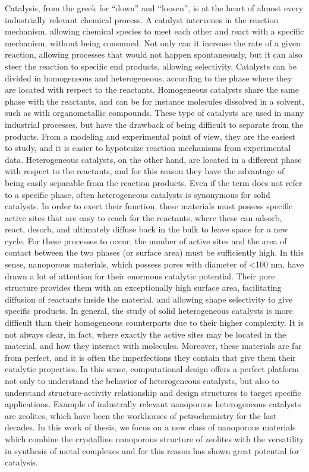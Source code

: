 Catalysis, from the greek for ``down'' and ``loosen'', is at the heart of almost every industrially relevant chemical process. A catalyst intervenes in the reaction mechanism, allowing chemical species to meet each other and react with a specific mechanism, without being consumed. Not only can it increase the rate of a given reaction, allowing processes that would not happen spontaneously, but it can also steer the reaction to specific end products, allowing selectivity. Catalysts can be divided in homogeneous and heterogeneous, according to the phase where they are located with respect to the reactants. Homogeneous catalysts share the same phase with the reactants, and can be for instance molecules dissolved in a solvent, such as with organometallic compounds. These type of catalysts are used in many industrial processes,  but have the drawback of being difficult to separate from the products. From a modeling and experimental point of view, they are the easiest to study, and it is easier to hypotesize reaction mechanisms from experimental data. Heterogeneous catalysts, on the other hand, are located in a different phase with respect to the reactants, and for this reason they have the advantage of being easily separable from the reaction products. Even if the term does not refer to a specific phase, often heterogeneous catalysts is synonymous for solid catalysts. In order to exert their function, these materials must possess specific active sites that are easy to reach for the reactants, where these can adsorb, react, desorb, and ultimately diffuse back in the bulk to leave space for a new cycle. For these processes to occur, the number of active sites and the area of contact between the two phases (or surface area) must be sufficiently high. In this sense, nanoporous materials, which possess pores with diameter of <100 nm, have drawn a lot of attention for their enormous catalytic potential. Their pore structure provides them with an exceptionally high surface area, facilitating diffusion of reactants inside the material, and allowing shape selectivity to give specific products. In general, the study of solid heterogeneous catalysts is more difficult than their homogeneous counterparts due to their higher complexity. It is not always clear, in fact, where exactly the active sites may be located in the material, and how they interact with molecules. Moreover, these materials are far from perfect, and it is often the imperfections they contain that give them their catalytic properties. In this sense, computational design offers a perfect platform not only to understand the behavior of heterogeneous catalysts, but also to understand structure-activity relationship and design structures to target specific applications. Example of industrally relevant nanoporous heterogeneous catalysts are zeolites, which have been the workhorses of petrochemistry for the last decades. In this work of thesis, we focus on a new class of nanoporous materials which combine the crystalline nanoporous structure of zeolites with the versatility in synthesis of metal complexes and for this reason has shown great potential for catalysis.


